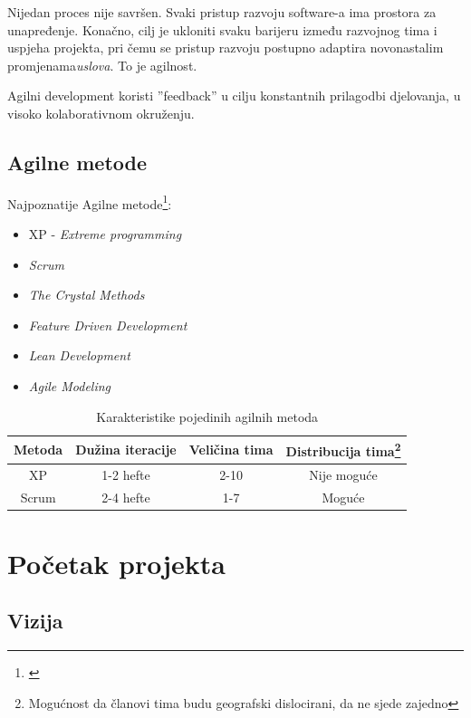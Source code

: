 \documentclass[lmodern, utf8, zavrsni]{fit}
\begin{document}
Nijedan proces nije savršen. Svaki pristup razvoju software-a ima prostora za unapređenje. Konačno, cilj je ukloniti svaku barijeru između razvojnog tima i uspjeha projekta, pri čemu se pristup razvoju postupno adaptira novonastalim promjenama\emph{uslova}. To je agilnost.\citep[str 355]{agileart}

Agilni development koristi ''feedback'' u cilju konstantnih prilagodbi djelovanja, u visoko kolaborativnom okruženju. \citep{agileprag}

\section{Agilne metode}

Najpoznatije Agilne metode\footnote{\citep{agiledacs}}:
\begin{itemize}
  \item XP - \emph{Extreme programming}
  \item \emph{Scrum}
  \item \emph{The Crystal Methods}
  \item \emph{Feature Driven Development}
  \item \emph{Lean Development}
  \item \emph{Agile Modeling}
\end{itemize}

\begin{savenotes}
\begin{table}[ht]
\centering
\begin{tabular}{c c c c}
\hline\hline
Metoda & Dužina iteracije & Veličina tima & Distribucija tima\footnote{{Mogućnost da članovi tima budu geografski dislocirani, da ne sjede zajedno}} \\
\hline
   XP  & 1-2 hefte & 2-10 & Nije moguće \\
  Scrum & 2-4 hefte & 1-7 & Moguće \\ [1ex]
\hline
\end{tabular}
\label{table:methodkarakteristike}
\caption{Karakteristike pojedinih agilnih metoda}
\end{table}
\end{savenotes}

\chapter{Početak projekta}

\section{Vizija}
\end{document}
